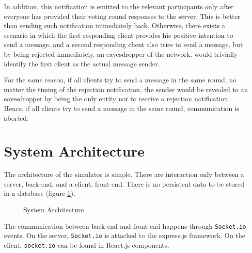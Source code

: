 In addition, this notification is emitted to the relevant participants only after everyone has provided their voting round responses to the server. This is better than sending such notification immediately back. Otherwise, there exists a scenario in which the first responding client provides his positive intention to send a message, and a second responding client also tries to send a message, but by being rejected immediately, an eavesdropper of the network, would trivially identify the first client as the actual message sender.

For the same reason, if all clients try to send a message in the same round, no matter the timing of the rejection notification,  the sender would be revealed to an eavesdropper by being the only entity not to receive a rejection notification. Hence, if all clients try to send a message in the same round, communication is aborted.


\section{System Architecture}
The architecture of the simulator is simple. There are interaction only between a server, back-end, and a client, front-end. There is no persistent data to be stored in a database (figure \ref{fig:systemArchitecture}).

\begin{figure}[H]
    \centering
    \caption{System Architecture}
    \label{fig:systemArchitecture}
\end{figure}

The communication between back-end and front-end happens through \lstinline{Socket.io} events. On the server, \lstinline{Socket.io} is attached to the express.js framework. On the client, \lstinline{socket.io} can be found in React.js components.

